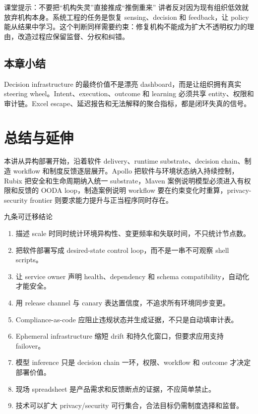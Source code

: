 \documentclass[a4paper]{article}
\begin{document}
\begin{knowledgebox}{课堂提示：不要把“机构失灵”直接推成“推倒重来”}
讲者反对因为现有组织低效就放弃机构本身。系统工程的任务是恢复 sensing、decision 和 feedback，让 policy 能从结果中学习。这个判断同样需要约束：修复机构不能成为扩大不透明权力的理由，改造过程应保留监督、分权和纠错。
\end{knowledgebox}

\subsection{本章小结}

Decision infrastructure 的最终价值不是漂亮 dashboard，而是让组织拥有真实 steering wheel。Intent、execution、outcome 和 learning 必须共享 entity、权限和审计链。Excel escape、延迟报告和无法解释的聚合指标，都是闭环失真的信号。

\section{总结与延伸}

本讲从异构部署开始，沿着软件 delivery、runtime substrate、decision chain、制造 workflow 和制度反馈逐层展开。Apollo 把软件与环境状态纳入持续控制，Rubix 把安全和生命周期纳入统一 substrate，Maven 案例说明模型必须进入有权限和反馈的 OODA loop，制造案例说明 workflow 要在约束变化时重算，privacy-security frontier 则要求能力提升与正当程序同时存在。

\begin{importantbox}{九条可迁移结论}
\begin{enumerate}
  \item 描述 scale 时同时统计环境异构性、变更频率和失联时间，不只统计节点数。
  \item 把软件部署写成 desired-state control loop，而不是一串不可观察 shell scripts。
  \item 让 service owner 声明 health、dependency 和 schema compatibility，自动化才能安全。
  \item 用 release channel 与 canary 表达置信度，不追求所有环境同步变更。
  \item Compliance-as-code 应阻止违规状态并生成证据，不只是自动填审计表。
  \item Ephemeral infrastructure 缩短 drift 和持久化窗口，但要求应用支持 failover。
  \item 模型 inference 只是 decision chain 一环，权限、workflow 和 outcome 才决定部署价值。
  \item 现场 spreadsheet 是产品需求和反馈断点的证据，不应简单禁止。
  \item 技术可以扩大 privacy/security 可行集合，合法目标仍需制度选择和监督。
\end{enumerate}
\end{importantbox}
\end{document}
